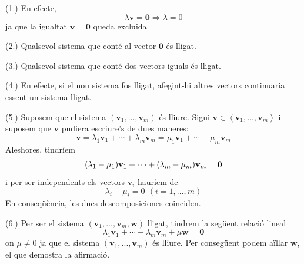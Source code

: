 \begin{prova}
(1.) En efecte,%
\begin{equation*}
\lambda \mathbf{v}=\mathbf{0}\Longrightarrow \lambda =0
\end{equation*}%
ja que la igualtat $\mathbf{v}=\mathbf{0}$ queda excluida.

(2.) Qualsevol sistema que conté al vector $\mathbf{0}$ és lligat.

(3.) Qualsevol sistema que conté dos vectors iguals és lligat.

(4.) En efecte, si el nou sistema fos lligat, afegint-hi altres
vectors continuaria essent un sistema lligat.

(5.) Suposem que el sistema $\left( \mathbf{v}_{1},...,\mathbf{v}%
_{m}\right) $ és lliure. Sigui $\mathbf{v}\in \left\langle \mathbf{v}_{1},...,%
\mathbf{v}_{m}\right\rangle $ i suposem que $\mathbf{v}$ pudiera
escriure's de dues maneres:%
\begin{equation*}
\mathbf{v}=\lambda _{1}\mathbf{v}_{1}+\cdots +\lambda _{m}\mathbf{v}_{m}=\mu
_{1}\mathbf{v}_{1}+\cdots +\mu _{m}\mathbf{v}_{m}
\end{equation*}%
Aleshores, tindríem%
\begin{equation*}
(\lambda _{1}-\mu _{1})\mathbf{v}_{1}+\cdots +(\lambda _{m}-\mu _{m})\mathbf{%
v}_{m}=\mathbf{0}
\end{equation*}%
i per ser independents els vectors $\mathbf{v}_{i}$ hauríem de%
\begin{equation*}
\lambda _{i}-\mu _{i}=0\,\ (i=1,...,m)
\end{equation*}%
En conseqüència, les dues descomposiciones coinciden.

(6.) Per ser el sistema $(\mathbf{v}_{1},...,\mathbf{v}_{m},\mathbf{w})$
lligat, tindrem la següent relació lineal%
\begin{equation*}
\lambda _{1}\mathbf{v}_{1}+\cdots +\lambda _{m}\mathbf{v}_{m}+\mu \mathbf{w}=%
\mathbf{0}
\end{equation*}%
on $\mu \neq 0$ ja que el sistema $(\mathbf{v}_{1},...,\mathbf{v}_{m})$
és lliure. Per consegüent podem aïllar $\mathbf{w}$, el que demostra
la afirmació.
\end{prova}

